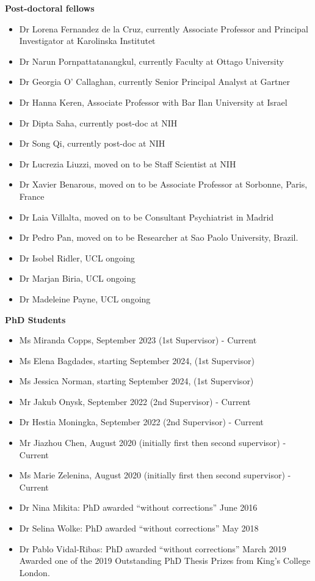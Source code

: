 \documentclass[
]{article}
\begin{document}
\textbf{Post-doctoral fellows}

\begin{itemize}
\item
  Dr Lorena Fernandez de la Cruz, currently Associate Professor and
  Principal Investigator at Karolinska Institutet
\item
  Dr Narun Pornpattatanangkul, currently Faculty at Ottago University
\item
  Dr Georgia O' Callaghan, currently Senior Principal Analyst at Gartner
\item
  Dr Hanna Keren, Associate Professor with Bar Ilan University at Israel
\item
  Dr Dipta Saha, currently post-doc at NIH
\item
  Dr Song Qi, currently post-doc at NIH
\item
  Dr Lucrezia Liuzzi, moved on to be Staff Scientist at NIH
\item
  Dr Xavier Benarous, moved on to be Associate Professor at Sorbonne,
  Paris, France
\item
  Dr Laia Villalta, moved on to be Consultant Psychiatrist in Madrid
\item
  Dr Pedro Pan, moved on to be Researcher at Sao Paolo University,
  Brazil.
\item
  Dr Isobel Ridler, UCL ongoing
\item
  Dr Marjan Biria, UCL ongoing
\item
  Dr Madeleine Payne, UCL ongoing
\end{itemize}

\textbf{PhD Students}

\begin{itemize}
\item
  Ms Miranda Copps, September 2023 (1st Supervisor) - Current
\item
  Ms Elena Bagdades, starting September 2024, (1st Supervisor)
\item
  Ms Jessica Norman, starting September 2024, (1st Supervisor)
\item
  Mr Jakub Onysk, September 2022 (2nd Supervisor) - Current
\item
  Dr Hestia Moningka, September 2022 (2nd Supervisor) - Current
\item
  Mr Jiazhou Chen, August 2020 (initially first then second supervisor)
  - Current
\item
  Ms Marie Zelenina, August 2020 (initially first then second
  supervisor) - Current
\item
  Dr Nina Mikita: PhD awarded ``without corrections'' June 2016
\item
  Dr Selina Wolke: PhD awarded ``without corrections'' May 2018
\item
  Dr Pablo Vidal-Ribas: PhD awarded ``without corrections'' March 2019
  Awarded one of the 2019 Outstanding PhD Thesis Prizes from King's
  College London.
\end{itemize}
\end{document}
